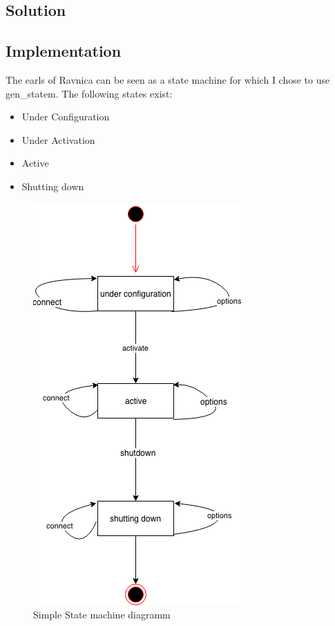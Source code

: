 \documentclass[12pt,a4paper]{article}
\begin{document}
\subsection{Solution}
\subsection{Implementation}
The earls of Ravnica can be seen as a state machine for which I chose to use gen\_statem.
The following states exist:
\begin{itemize}
	\item Under Configuration
	\item Under Activation
	\item Active
	\item Shutting down
\end{itemize}

\begin{figure}[!htb]
	\includegraphics{images/ravnica}
	\caption{Simple State machine diagramm}
\end{figure}
\end{document}
